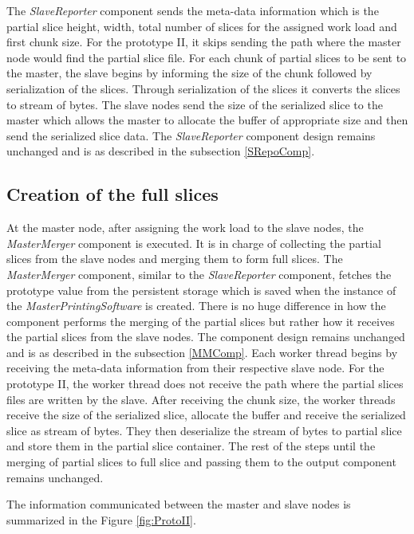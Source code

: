 The \textit{SlaveReporter} component sends the meta-data information which is the partial slice height, width, total number of slices for the assigned work load and first chunk size. For the prototype II, it skips sending the path where the master node would find the partial slice file. For each chunk of partial slices to be sent to the master, the slave begins by informing the size of the chunk followed by serialization of the slices. Through serialization of the slices it converts the slices to stream of bytes. The slave nodes send the size of the serialized slice to the master which allows the master to allocate the buffer of appropriate size and then send the serialized slice data. The \textit{SlaveReporter} component design remains unchanged and is as described in the subsection \ref{SRepoComp}.

\subsection{Creation of the full slices}

At the master node, after assigning the work load to the slave nodes, the \textit{MasterMerger} component is executed. It is in charge of collecting the partial slices from the slave nodes and merging them to form full slices. The \textit{MasterMerger} component, similar to the \textit{SlaveReporter} component, fetches the prototype value from the persistent storage which is saved when the instance of the \textit{MasterPrintingSoftware} is created. There is no huge difference in how the component performs the merging of the partial slices but rather how it receives the partial slices from the slave nodes. The component design remains unchanged and is as described in the subsection \ref{MMComp}. Each worker thread begins by receiving the meta-data information from their respective slave node. For the prototype II, the worker thread does not receive the path where the partial slices files are written by the slave. After receiving the chunk size, the worker threads receive the size of the serialized slice, allocate the buffer and receive the serialized slice as stream of bytes. They then deserialize the stream of bytes to partial slice and store them in the partial slice container. The rest of the steps until the merging of partial slices to full slice and passing them to the output component remains unchanged.

The information communicated between the master and slave nodes is summarized in the Figure \ref{fig:ProtoII}.

